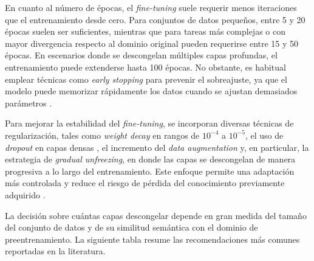 	En cuanto al número de épocas, el \textit{fine-tuning} suele requerir menos iteraciones que el entrenamiento desde cero. Para conjuntos de datos pequeños, entre 5 y 20 épocas suelen ser suficientes, mientras que para tareas más complejas o con mayor divergencia respecto al dominio original pueden requerirse entre 15 y 50 épocas. En escenarios donde se descongelan múltiples capas profundas, el entrenamiento puede extenderse hasta 100 épocas. No obstante, es habitual emplear técnicas como \textit{early stopping} para prevenir el sobreajuste, ya que el modelo puede memorizar rápidamente los datos cuando se ajustan demasiados parámetros \cite{pan2010}.
	
	Para mejorar la estabilidad del \textit{fine-tuning}, se incorporan diversas técnicas de regularización, tales como \textit{weight decay} en rangos de $10^{-4}$ a $10^{-5}$, el uso de \textit{dropout} en capas densas \cite{oquab2014}, el incremento del \textit{data augmentation} y, en particular, la estrategia de \textit{gradual unfreezing}, en donde las capas se descongelan de manera progresiva a lo largo del entrenamiento. Este enfoque permite una adaptación más controlada y reduce el riesgo de pérdida del conocimiento previamente adquirido \cite{howard2018}.
	
	La decisión sobre cuántas capas descongelar depende en gran medida del tamaño del conjunto de datos y de su similitud semántica con el dominio de preentrenamiento. La siguiente tabla resume las recomendaciones más comunes reportadas en la literatura.
	
	
	
	\small
	\renewcommand{\arraystretch}{1.2}
	
